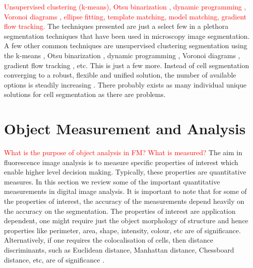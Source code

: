 \begin{definition}
	\textcolor{red}{Unsupervised clustering (k-means), Otsu binarization , dynamic programming , Voronoi diagrams , ellipse fitting, template matching, model matching, gradient flow tracking.}
	The techniques presented are just a select few in a plethora segmentation techniques that have been used in microscopy image segmentation.
	A few other common techniques are unsupervised clustering segmentation using the k-means \citep{Ng2006,Shrivastava2014,Dhanachandra2015}, Otsu binarization \citep{Chen2006}, dynamic programming \citep{Liu2007,Zhang2007}, Voronoi diagrams \citep{Cardenes2003,Jiang2005}, gradient flow tracking \citep{Li2007}, etc.
	This is just a few more.
	Instead of cell segmentation converging to a robust, flexible and unified solution, the number of available options is steadily increasing \citep{Meijering2012}.
	There probably exists as many individual unique solutions for cell segmentation as there are problems.
\end{definition}


\section{Object Measurement and Analysis}
\label{sec:Measurements}

\textcolor{red}{What is the purpose of object analysis in FM? What is measured?}
The aim in fluorescence image analysis is to measure specific properties of interest which enable higher level decision making.
Typically, these properties are quantitative measures.
In this section we review some of the important quantitative measurements in digital image analysis.
It is important to note that for some of the properties of interest, the accuracy of the measurements depend heavily on the accuracy on the segmentation.
The properties of interest are application dependent, one might require just the object morphology of structure and hence properties like perimeter, area, shape, intensity, colour, etc are of significance.
Alternatively, if one requires the colocalisation of cells, then distance discriminants, such as Euclidean distance, Manhattan distance, Chessboard distance, etc, are of significance \citep{Fatima2008_2,Danek2012}.

